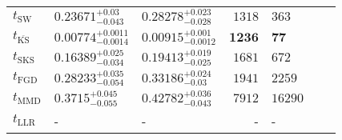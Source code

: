 \begin{tabular}{l|llr|llr}
	\midrule
	$t_{\mathrm{SW}}$ & $0.23671_{-0.043}^{+0.03}$ & $0.28278_{-0.028}^{+0.023}$ & $1318$ & $363$ \\
	$t_{\overline{\mathrm{KS}}}$ & ${\mathbf{0.00774_{-0.0014}^{+0.0011}}}$ & ${\mathbf{0.00915_{-0.0012}^{+0.001}}}$ & ${\mathbf{1236}}$ & ${\mathbf{77}}$ \\
	$t_{\mathrm{SKS}}$ & $0.16389_{-0.034}^{+0.025}$ & $0.19413_{-0.025}^{+0.019}$ & $1681$ & $672$ \\
	$t_{\mathrm{FGD}}$ & $0.28233_{-0.054}^{+0.035}$ & $0.33186_{-0.03}^{+0.024}$ & $1941$ & $2259$ \\
	$t_{\mathrm{MMD}}$ & $0.3715_{-0.055}^{+0.045}$ & $0.42782_{-0.043}^{+0.036}$ & $7912$ & $16290$ \\
	$t_{\mathrm{LLR}}$ & - & - & - & - \\
	\bottomrule
\end{tabular}